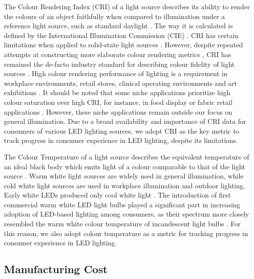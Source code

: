 \documentclass[twoside,twocolumn,9pt]{article}
\begin{document}
The Colour Rendering Index (CRI) of a light source describes its ability to render the colours of an object faithfully when compared to illumination under a reference light source, such as standard daylight \cite{khan2015led}. The way it is calculated is defined by the International Illumination Commission (CIE) \cite{cie_cri_1995}. CRI has certain limitations when applied to solid-state light sources \cite{david2013cri}. However, despite repeated attempts at constructing more elaborate colour rendering metrics \cite{Houser2013}, CRI has remained the de-facto industry standard for describing colour fidelity of light sources \cite{DOE2016LED}. High colour rendering performance of lighting is a requirement in workplace environments, retail stores, clinical operating environments and art exhibitions \cite{khanh2017color}. It should be noted that some niche applications prioritize high colour saturation over high CRI, for instance, in food display or fabric retail applications \cite{david2013cri}. However, these niche applications remain outside our focus on general illumination. Due to a broad availability and importance of CRI data for consumers of various LED lighting sources, we adopt CRI as the key metric to track progress in consumer experience in LED lighting, despite its limitations. 

The Colour Temperature of a light source describes the equivalent temperature of an ideal black body which emits light of a colour comparable to that of the light source \cite{commission2011cie}. Warm white light sources are widely used in general illumination, while cold white light sources are used in workplace illumination and outdoor lighting. Early white LEDs produced only cool white light \cite{mueller2000light}. The introduction of first commercial warm white LED light bulbs played a significant part in increasing adoption of LED-based lighting among consumers, as their spectrum more closely resembled the warm white colour temperature of incandescent light bulbs \cite{al2016optics}. For this reason, we also adopt colour temperature as a metric for tracking progress in consumer experience in LED lighting.

\subsection{Manufacturing Cost}
\end{document}
